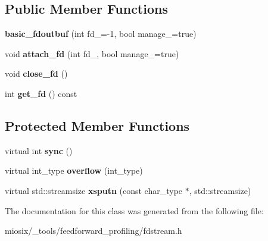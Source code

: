 \subsection*{Public Member Functions}
\begin{DoxyCompactItemize}
\item 
\hypertarget{classbasic__fdoutbuf_a1e2365e9f632996db2038134fdb5cd4d}{{\bfseries basic\-\_\-fdoutbuf} (int fd\-\_\-=-\/1, bool manage\-\_\-=true)}\label{classbasic__fdoutbuf_a1e2365e9f632996db2038134fdb5cd4d}

\item 
\hypertarget{classbasic__fdoutbuf_ac6dc045b24aaecfe8d60f8de24464480}{void {\bfseries attach\-\_\-fd} (int fd\-\_\-, bool manage\-\_\-=true)}\label{classbasic__fdoutbuf_ac6dc045b24aaecfe8d60f8de24464480}

\item 
\hypertarget{classbasic__fdoutbuf_a8f49513d25ca12fb1b3c4a9727060701}{void {\bfseries close\-\_\-fd} ()}\label{classbasic__fdoutbuf_a8f49513d25ca12fb1b3c4a9727060701}

\item 
\hypertarget{classbasic__fdoutbuf_a49f473a0875c94f8707be0dff5850cb6}{int {\bfseries get\-\_\-fd} () const }\label{classbasic__fdoutbuf_a49f473a0875c94f8707be0dff5850cb6}

\end{DoxyCompactItemize}
\subsection*{Protected Member Functions}
\begin{DoxyCompactItemize}
\item 
\hypertarget{classbasic__fdoutbuf_ab54d9f51fcebc2d6eb4aeec207e3a36f}{virtual int {\bfseries sync} ()}\label{classbasic__fdoutbuf_ab54d9f51fcebc2d6eb4aeec207e3a36f}

\item 
\hypertarget{classbasic__fdoutbuf_a3390cb3462a5aea555e787b1b175fb12}{virtual int\-\_\-type {\bfseries overflow} (int\-\_\-type)}\label{classbasic__fdoutbuf_a3390cb3462a5aea555e787b1b175fb12}

\item 
\hypertarget{classbasic__fdoutbuf_aa52026d21e578204dd40633990b86aa4}{virtual std\-::streamsize {\bfseries xsputn} (const char\-\_\-type $\ast$, std\-::streamsize)}\label{classbasic__fdoutbuf_aa52026d21e578204dd40633990b86aa4}

\end{DoxyCompactItemize}


The documentation for this class was generated from the following file\-:\begin{DoxyCompactItemize}
\item 
miosix/\-\_\-tools/feedforward\-\_\-profiling/fdstream.\-h\end{DoxyCompactItemize}
